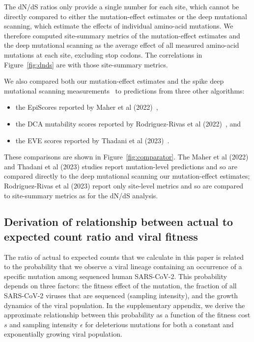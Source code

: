 \documentclass[9pt,twocolumn,twoside]{gsajnl_modified}
\begin{document}
{The dN/dS ratios only provide a single number for each site, which cannot be directly compared to either the mutation-effect estimates or the deep mutational scanning, which estimate the effects of individual amino-acid mutations.
We therefore computed site-summary metrics of the mutation-effect estimates and the deep mutational scanning as the average effect of all measured amino-acid mutations at each site, excluding stop codons.
The correlations in Figure~\ref{fig:dnds} are with those site-summary metrics.

We also compared both our mutation-effect estimates and the spike deep mutational scanning measurements~\citep{dadonaite2023pseudovirus} to predictions from three other algorithms:
\begin{itemize}
\item the EpiScores reported by Maher et al (2022)~\cite{maher2022predicting},
\item the DCA mutability scores reported by Rodriguez-Rivas et al (2022)~\cite{rodriguez2022epistatic}, and
\item the EVE scores reported by Thadani et al (2023)~\cite{thadani2022learning}.
\end{itemize}
These comparisons are shown in Figure~\ref{fig:comparator}.
The Maher et al (2022) and Thadani et al (2023) studies report mutation-level predictions and so are compared directly to the deep mutational scanning our mutation-effect estimates; Rodriguez-Rivas et al (2023) report only site-level metrics and so are compared to site-summary metrics as for the dN/dS analysis.

\subsection{Derivation of relationship between actual to expected count ratio and viral fitness}
The ratio of actual to expected counts that we calculate in this paper is related to the probability that we observe a viral lineage containing an occurrence of a specific mutation among sequenced human SARS-CoV-2.
This probability depends on three factors: the fitness effect of the mutation, the fraction of all SARS-CoV-2 viruses that are sequenced (sampling intensity), and the growth dynamics of the viral population.
In the supplementary appendix, we derive the approximate relationship between this probability as a function of the fitness cost $s$ and sampling intensity $\epsilon$ for deleterious mutations for both a constant and exponentially growing viral population.

}
\end{document}
